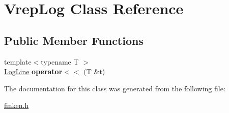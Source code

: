 \hypertarget{classVrepLog}{}\section{Vrep\+Log Class Reference}
\label{classVrepLog}
\subsection*{Public Member Functions}
\begin{DoxyCompactItemize}
\item 
{\footnotesize template$<$typename T $>$ }\\\hyperlink{classLogLine}{Log\+Line} {\bfseries operator$<$$<$} (T \&t)\hypertarget{classVrepLog_a1a2744fc0ca891c3bf9767395791914b}{}\label{classVrepLog_a1a2744fc0ca891c3bf9767395791914b}

\end{DoxyCompactItemize}


The documentation for this class was generated from the following file\+:\begin{DoxyCompactItemize}
\item 
\hyperlink{finken_8h}{finken.\+h}\end{DoxyCompactItemize}

